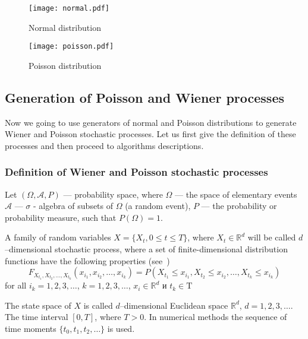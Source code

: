 \documentclass[%
floatfix,
showkeys,
nofootinbib, %
superscriptaddress, %
]{revtex4-1}
\begin{document}
\begin{figure}
  \centering
  \begin{minipage}[b]{0.48\linewidth}
    \texttt{[image: normal.pdf]}
    \caption{Normal distribution}
    \label{fig:normal}
  \end{minipage}
  \hfill
  \begin{minipage}[b]{0.48\linewidth}
    \texttt{[image: poisson.pdf]}
    \caption{Poisson distribution}
    \label{fig:poisson}
  \end{minipage}
\end{figure}

\subsection{Generation of Poisson and Wiener processes}

Now we going to use generators of normal and Poisson distributions to
generate Wiener and Poisson stochastic processes. Let us first give
the definition of these processes and then proceed to algorithms
descriptions.

\subsubsection{Definition of Wiener and Poisson stochastic processes}

Let $(\Omega, \mathscr{A}, P)$ --- probability space, where $\Omega$
--- the space of elementary events $\mathscr{A}$ --- $\sigma$ -
algebra of subsets of $\Omega$ (a random event), $P$ --- the
probability or probability measure, such that $P(\Omega) = 1$.


A family of random variables
$X = \{X_{t}, 0 \leqslant t \leqslant T\}$, where
$X_{t} \in \mathbb{R}^{d}$ will be called $d$--dimensional stochastic
process, where a set of finite-dimensional distribution functions have
the following properties (see~\cite{L_Kloeden_Platen, L_Oksendal_en})
        \[
                F_{X_{t_{1}},X_{t_{2}},\ldots,X_{t_{k}}}(x_{i_1},x_{i_2},\ldots,x_{i_k}) = P(X_{t_{1}}\leqslant x_{i_1}, X_{t_{2}} \leqslant x_{i_2}, \ldots, X_{t_{k}} \leqslant x_{i_k})
        \]
        for all $i_{k} = 1,2,3,\ldots$, $k = 1,2,3,\ldots$, $x_{i} \in \mathbb{R}^{d}$ и $t_{k} \in \mathrm{T}$

        The state space of $X$ is called $d$--dimensional Euclidean
        space $\mathbb{R}^{d}$, $d=1,2,3,\ldots$. The time interval
        $[0, T]$, where $T>0$. In numerical methods the sequence of
        time moments $\{t_0,t_1,t_2,\ldots \}$ is used.
\end{document}
